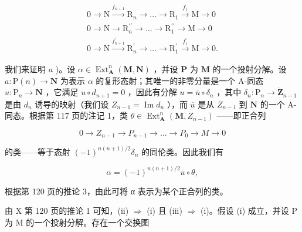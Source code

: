\[
\begin{array}{c} 0 \longrightarrow \mathrm{N} \xrightarrow {f _ {n + 1}} \mathrm{R} _ {n} \longrightarrow \dots \longrightarrow \mathrm{R} _ {1} \xrightarrow {f _ {1}} \mathrm{M} \longrightarrow 0 \\ 0 \longrightarrow \mathrm{N} \longrightarrow \mathrm{R} _ {n} ^ {\prime \prime} \longrightarrow \dots \longrightarrow \mathrm{R} _ {1} ^ {\prime \prime} \longrightarrow \mathrm{M} \longrightarrow 0 \\ 0 \longrightarrow \mathrm{N} \xrightarrow {f _ {n + 1} ^ {\prime}} \mathrm{R} _ {n} ^ {\prime} \longrightarrow \dots \longrightarrow \mathrm{R} _ {1} ^ {\prime} \xrightarrow {f _ {1} ^ {\prime}} \mathrm{M} \longrightarrow 0. \end{array}
\]

我们来证明 \(a\) )。设 \(\alpha \in \operatorname{Ext}_{\mathbf{A}}^{n}(\mathbf{M}, \mathbf{N})\) ，并设 \(\mathbf{P}\) 为 \(\mathbf{M}\) 的一个投射分解。设 \(a: \mathrm{P}(n) \to \mathbf{N}\) 为表示 \(\alpha\) 的复形态射；其唯一的非零分量是一个 A-同态 \(u: \mathrm{P}_{n} \to \mathbf{N}\) ，它满足 \(u \circ d_{n+1} = 0\) ，因此有分解 \(u = \overline{u} \circ \delta_{n}\) ，其中 \(\delta_{n}: \mathrm{P}_{n} \to \dot{\mathbf{Z}}_{n-1}\) 是由 \(d_{n}\) 诱导的映射（我们设 \(Z_{n-1} = \operatorname{Im} d_{n}\) ），而 \(\overline{u}\) 是从 \(Z_{n-1}\) 到 \(\mathbf{N}\) 的一个 A-同态。根据第 117 页的注记 1，类 \(\theta \in \operatorname{Ext}_{\mathbf{A}}^{n}(\mathbf{M}, Z_{n-1})\) ——即正合列

\[
0 \rightarrow Z _ {n - 1} \rightarrow P _ {n - 1} \rightarrow \dots \rightarrow P _ {0} \rightarrow M \rightarrow 0
\]

的类——等于态射 \((-1)^{n(n + 1) / 2}\delta_n\) 的同伦类。因此我们有

\[
\alpha = (- 1) ^ {n (n + 1) / 2} \overline {{{u}}} \circ \theta ,
\]

根据第 120 页的推论 3，由此可将 α 表示为某个正合列的类。

由 X 第 120 页的推论 1 可知，(ii) \(\Rightarrow\) (i) 且 (iii) \(\Rightarrow\) (i)。假设 (i) 成立，并设 P 为 M 的一个投射分解。存在一个交换图

